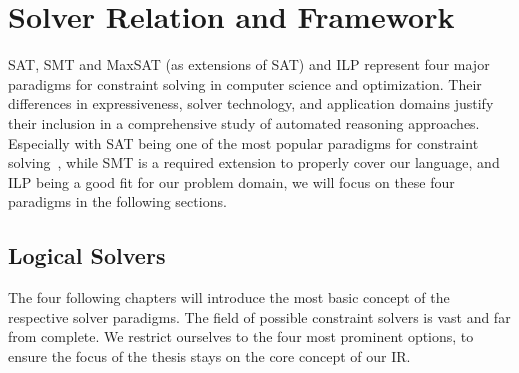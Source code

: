 \cleardoubleoddpage%

\chapter{Solver Relation and Framework}
\label{chapter:solver-relation-framework}
\ac{SAT}, \ac{SMT} and \ac{MaxSAT} (as extensions of \ac{SAT}) and \ac{ILP} represent four major paradigms for constraint solving in computer science and optimization. Their differences in expressiveness, solver technology, and application domains justify their inclusion in a comprehensive study of automated reasoning approaches. Especially with \ac{SAT} being one of the most popular paradigms for constraint solving~\cite{bib:2023-ulrich-oltean}, while \ac{SMT} is a required extension to properly cover our language, and \ac{ILP} being a good fit for our problem domain, we will focus on these four paradigms in the following sections.

\section{Logical Solvers}
The four following chapters will introduce the most basic concept of the respective solver paradigms. The field of possible constraint solvers is vast and far from complete. We restrict ourselves to the four most prominent options, to ensure the focus of the thesis stays on the core concept of our \Ac{IR}.

